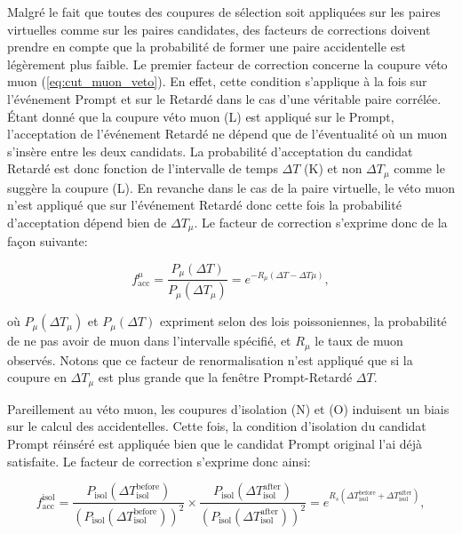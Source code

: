 Malgré le fait que toutes des coupures de sélection soit appliquées sur les paires virtuelles comme sur les paires candidates, des facteurs de corrections doivent prendre en compte que la probabilité de former une paire accidentelle est légèrement plus faible. Le premier facteur de correction concerne la coupure véto muon (\ref{eq:cut_muon_veto}). En effet, cette condition s'applique à la fois sur l'événement Prompt et sur le Retardé dans le cas d'une véritable paire corrélée. Étant donné que la coupure véto muon (L) est appliqué sur le Prompt, l'acceptation de l'événement Retardé ne dépend que de l'éventualité où un muon s'insère entre les deux candidats. La probabilité d'acceptation du candidat Retardé est donc fonction de l'intervalle de temps $\Delta T$ (K) et non $\Delta T_\mu$ comme le suggère la coupure (L). En revanche dans le cas de la paire virtuelle, le véto muon n'est appliqué que sur l'événement Retardé donc cette fois la probabilité d'acceptation dépend bien de $\Delta T_\mu$. Le facteur de correction s'exprime donc de la façon suivante:

\begin{equation}
    f^\mu_\textrm{acc} = \frac{P_\mu(\Delta T)}{P_\mu(\Delta T_\mu)} = e^{-R_\mu (\Delta T - \Delta T\mu)},
\end{equation}

\bigbreak

où $P_\mu(\Delta T_\mu)$ et $P_\mu(\Delta T)$ expriment selon des lois poissoniennes, la probabilité de ne pas avoir de muon dans l'intervalle spécifié, et $R_\mu$ le taux de muon observés. Notons que ce facteur de renormalisation n'est appliqué que si la coupure en $\Delta T_\mu$ est plus grande que la fenêtre Prompt-Retardé $\Delta T$.

\bigbreak

Pareillement au véto muon, les coupures d'isolation (N) et (O) induisent un biais sur le calcul des accidentelles. Cette fois, la condition d'isolation du candidat Prompt réinséré est appliquée bien que le candidat Prompt original l'ai déjà satisfaite. Le facteur de correction s'exprime donc ainsi:

\begin{equation}
    f^\textrm{isol}_\textrm{acc} = \frac{P_\textrm{isol} (\Delta T_\textrm{isol}^\textrm{before})}{\left(P_\textrm{isol} (\Delta T_\textrm{isol}^\textrm{before})\right)^2} \times \frac{P_\textrm{isol} (\Delta T_\textrm{isol}^\textrm{after})}{\left(P_\textrm{isol} (\Delta T_\textrm{isol}^\textrm{after})\right)^2} = e^{R_s (\Delta T_\textrm{isol}^\textrm{before} + \Delta T_\textrm{isol}^\textrm{after})},
\end{equation}

